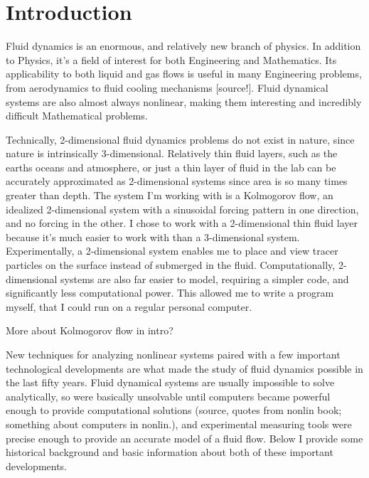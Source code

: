 		

        \chapter*{Introduction}

	
	Fluid dynamics is an enormous, and relatively new branch of physics.  In addition to Physics, it's a field of interest for both Engineering and Mathematics.  Its applicability to both liquid and gas flows is useful in many Engineering problems, from aerodynamics to fluid cooling mechanisms [source!].  Fluid dynamical systems are also almost always nonlinear, making them interesting and incredibly difficult Mathematical problems.

	Technically, 2-dimensional fluid dynamics problems do not exist in nature, since nature is intrinsically 3-dimensional.  Relatively thin fluid layers, such as the earths oceans and atmosphere, or just a thin layer of fluid in the lab can be accurately approximated as 2-dimensional systems since area is so many times greater than depth.  The system I'm working with is a Kolmogorov flow, an idealized 2-dimensional system with a sinusoidal forcing pattern in one direction, and no forcing in the other.  I chose to work with a 2-dimensional thin fluid layer because it's much easier to work with than a 3-dimensional system.  Experimentally, a 2-dimensional system enables me to place and view tracer particles on the surface instead of submerged in the fluid.  Computationally, 2-dimensional systems are also far easier to model, requiring a simpler code, and  significantly less computational power.  This allowed me to write a program myself, that I could run on a regular personal computer.
	
	More about Kolmogorov flow in intro?
	

	New techniques for analyzing nonlinear systems paired with a few important technological developments are what made the study of fluid dynamics possible in the last fifty years.  Fluid dynamical systems are usually impossible to solve analytically, so were basically unsolvable until computers became powerful enough to provide computational solutions (source, quotes from nonlin book; something about computers in nonlin.), and experimental measuring tools were precise enough to provide an accurate model of a fluid flow.  Below I provide some historical background and basic information about both of these important developments.

